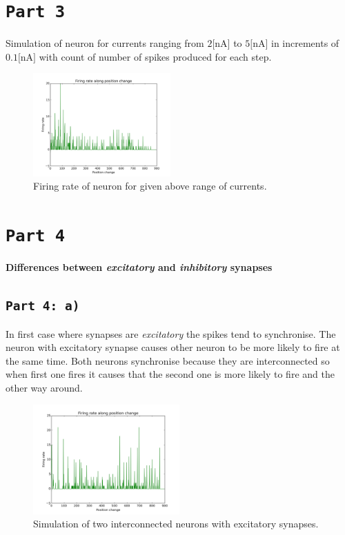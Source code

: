 \documentclass[12pt,a4paper,twocolumn]{article}
\begin{document}
\section*{\texttt{Part 3}}
Simulation of neuron for currents ranging from $2 \text{[nA]}$ to $5 \text{[nA]}$ in increments of $0.1 \text{[nA]}$ with count of number of spikes produced for each step.\\
\begin{figure}[phtb]
\centering
\includegraphics[width=0.47\textwidth]{figure3.png}
\caption{Firing rate of neuron for given above range of currents.\label{fig:part3}}
\vspace{0.2cm}
\end{figure}

\section*{\texttt{Part 4}}
\textbf{\large Differences between \emph{excitatory} and \emph{inhibitory} synapses}

\subsection*{\texttt{Part 4: a)}}
In first case where synapses are \emph{excitatory} the spikes tend to synchronise. The neuron with excitatory synapse causes other neuron to be more likely to fire at the same time. Both neurons synchronise because they are interconnected so when first one fires it causes that the second one is more likely to fire and the other way around.\\

\begin{figure}[htbp]
\centering
\includegraphics[width=0.5\textwidth]{figure4.png}
\caption{Simulation of two interconnected neurons with excitatory synapses.\label{fig:part4a}}
\vspace{0.2cm}
\end{figure}
\end{document}
